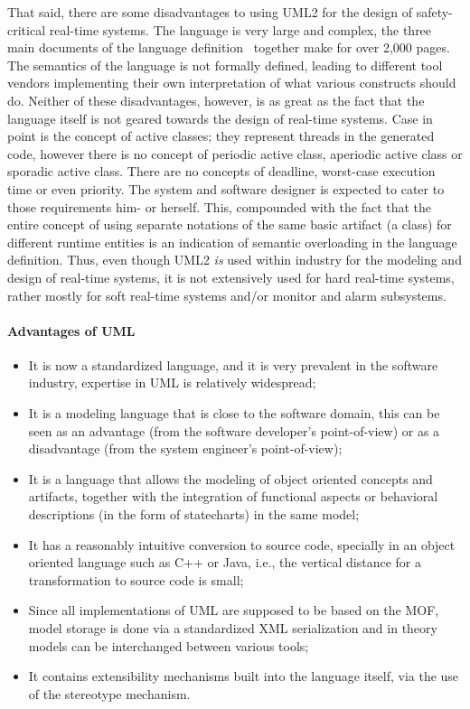 That said, there are some disadvantages to using UML2 for the design
of safety-critical real-time systems. The language is very large and
complex, the three main documents of the language
definition~\cite{mof-std, uml-infra, uml-super} together make for over
2,000 pages. The semantics of the language is not formally defined,
leading to different tool vendors implementing their own
interpretation of what various constructs should do. Neither of these
disadvantages, however, is as great as the fact that the language
itself is not geared towards the design of real-time systems. Case in
point is the concept of active classes; they represent threads in the
generated code, however there is no concept of periodic active class,
aperiodic active class or sporadic active class. There are no concepts
of deadline, worst-case execution time or even priority. The system
and software designer is expected to cater to those requirements him-
or herself. This, compounded with the fact that the entire concept of
using separate notations of the same basic artifact (a class) for
different runtime entities is an indication of semantic overloading in
the language definition. Thus, even though UML2 \emph{is} used within
industry for the modeling and design of real-time systems, it is not
extensively used for hard real-time systems, rather mostly for soft
real-time systems and/or monitor and alarm subsystems.

\paragraph{Advantages of UML}
\begin{itemize}
\item{It is now a standardized language, and it is very prevalent in
  the software industry, expertise in UML is relatively widespread;}
\item{It is a modeling language that is close to the software domain,
  this can be seen as an advantage (from the software developer's
  point-of-view) or as a disadvantage (from the system engineer's
  point-of-view);}
\item{It is a language that allows the modeling of object oriented
  concepts and artifacts, together with the integration of functional
  aspects or behavioral descriptions (in the form of statecharts) in
  the same model;}
\item{It has a reasonably intuitive conversion to source code,
  specially in an object oriented language such as C++ or Java, i.e.,
  the vertical distance for a transformation to source code is small;}
\item{Since all implementations of UML are supposed to be based on the
  MOF, model storage is done via a standardized XML serialization and
  in theory models can be interchanged between various tools;}
\item{It contains extensibility mechanisms built into the language
  itself, via the use of the stereotype mechanism.}
\end{itemize}

